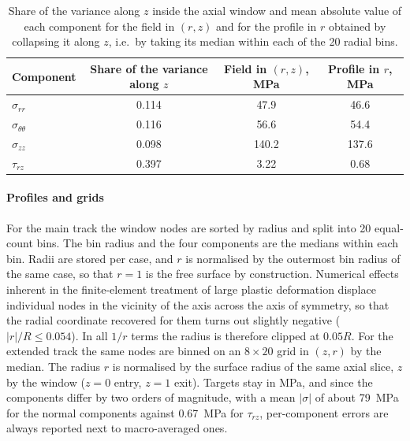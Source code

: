 \documentclass[pdflatex,sn-basic,Numbered]{sn-jnl}
\begin{document}
\begin{table}[htbp]
\centering
\caption[Variance along $z$ and the effect of collapsing the field]{Share of the variance along $z$ inside the axial window and mean absolute value of each component for the field in $(r,z)$ and for the profile in $r$ obtained by collapsing it along $z$, i.e.\ by taking its median within each of the 20 radial bins.}
\label{tab:zshare}
\begin{tabular}{@{}lccc@{}}
\toprule
Component & Share of the variance along $z$ & Field in $(r,z)$, MPa & Profile in $r$, MPa \\
\midrule
$\sigma_{rr}$           & 0.114 & 47.9  & 46.6  \\
$\sigma_{\theta\theta}$ & 0.116 & 56.6  & 54.4  \\
$\sigma_{zz}$           & 0.098 & 140.2 & 137.6 \\
$\tau_{rz}$             & 0.397 & 3.22  & 0.68  \\
\bottomrule
\end{tabular}
\end{table}

\paragraph{Profiles and grids}
For the main track the window nodes are sorted by radius and split into 20 equal-count bins. The bin radius and the four components are the medians within each bin.
Radii are stored per case, and $r$ is normalised by the outermost bin radius of the same case, so that $r=1$ is the free surface by construction.
Numerical effects inherent in the finite-element treatment of large plastic deformation displace individual nodes in the vicinity of the axis across the axis of symmetry, so that the radial coordinate recovered for them turns out slightly negative ($|r|/R \le 0.054$). In all $1/r$ terms the radius is therefore clipped at $0.05R$.
For the extended track the same nodes are binned on an $8\times20$ grid in $(z,r)$ by the median. The radius $r$ is normalised by the surface radius of the same axial slice, $z$ by the window ($z=0$ entry, $z=1$ exit).
Targets stay in MPa, and since the components differ by two orders of magnitude, with a mean $|\sigma|$ of about 79~MPa for the normal components against 0.67~MPa for $\tau_{rz}$, per-component errors are always reported next to macro-averaged ones.
\end{document}
